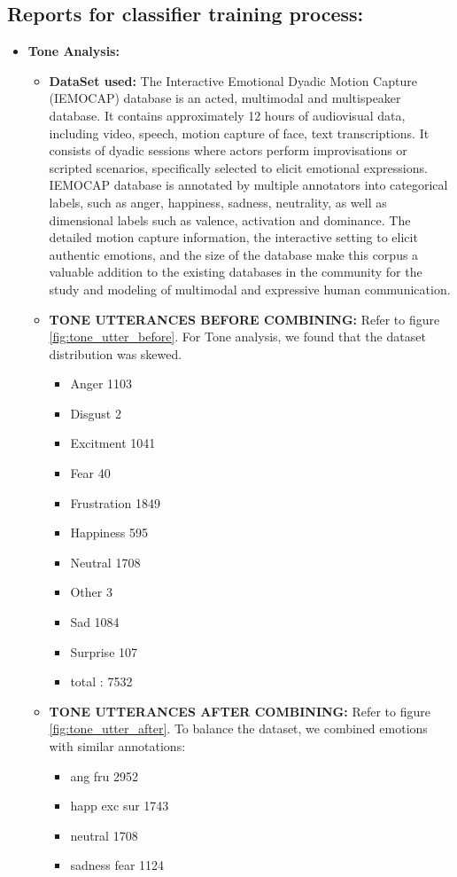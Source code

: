 \documentclass[oneside,a4paper,12pt]{report}
\begin{document}
\begin{normalsize}
  \section{Reports for classifier training process: }
	\begin{itemize}
		\item \textbf{Tone Analysis: }
			\begin{itemize}
				\item \textbf{DataSet used:} \newline
				\hspace{15mm}The Interactive Emotional Dyadic Motion Capture (IEMOCAP) database is an acted, multimodal and multispeaker database. It contains approximately 12 hours of audiovisual data, including video, speech, motion capture of face, text transcriptions. It consists of dyadic sessions where actors perform improvisations or scripted scenarios, specifically selected to elicit emotional expressions. IEMOCAP database is annotated by multiple annotators into categorical labels, such as anger, happiness, sadness, neutrality, as well as dimensional labels such as valence, activation and dominance. The detailed motion capture information, the interactive setting to elicit authentic emotions, and the size of the database make this corpus a valuable addition to the existing databases in the community for the study and modeling of multimodal and expressive human communication.
				
				
				\vspace{10mm}
				\item \textbf{TONE UTTERANCES BEFORE COMBINING:}
				Refer to figure \ref{fig:tone_utter_before}. For Tone analysis, we found that the dataset distribution was skewed.
				\begin{itemize}
				\item Anger 1103
				\item Disgust 2
				\item Excitment 1041
				\item Fear 40
				\item Frustration 1849
				\item Happiness 595
				\item Neutral 1708	
				\item Other 3
				\item Sad 1084
				\item Surprise 107
				
				\item total : 7532
			\end{itemize}	
				\vspace{10mm}
				\item \textbf{TONE UTTERANCES AFTER COMBINING:}
				Refer to figure \ref{fig:tone_utter_after}. To balance the dataset, we combined emotions with similar annotations:
				\begin{itemize}
					\item 	ang fru 2952
					\item happ exc sur 1743
					\item neutral 1708
					\item sadness fear 1124
				\end{itemize}
		

\end{itemize}
\end{itemize}
\end{normalsize}
\end{document}
